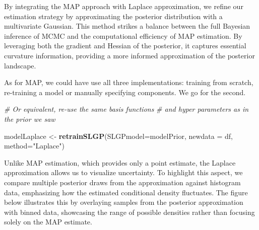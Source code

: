 \documentclass[
]{article}
\newenvironment{Shaded}{\begin{snugshade}}{\end{snugshade}}
\newcommand{\AttributeTok}[1]{\textcolor[rgb]{0.13,0.29,0.53}{#1}}
\newcommand{\CommentTok}[1]{\textcolor[rgb]{0.56,0.35,0.01}{\textit{#1}}}
\newcommand{\FunctionTok}[1]{\textcolor[rgb]{0.13,0.29,0.53}{\textbf{#1}}}
\newcommand{\NormalTok}[1]{#1}
\newcommand{\OtherTok}[1]{\textcolor[rgb]{0.56,0.35,0.01}{#1}}
\newcommand{\StringTok}[1]{\textcolor[rgb]{0.31,0.60,0.02}{#1}}
\begin{document}
By integrating the MAP approach with Laplace approximation, we refine our estimation strategy by approximating the posterior distribution with a multivariate Gaussian. This method strikes a balance between the full Bayesian inference of MCMC and the computational efficiency of MAP estimation. By leveraging both the gradient and Hessian of the posterior, it captures essential curvature information, providing a more informed approximation of the posterior landscape.

As for MAP, we could have use all three implementations: training from scratch, re-training a model or manually specifying components. We go for the second.

\begin{Shaded}
\begin{Highlighting}[]
\CommentTok{\# Or equivalent, re{-}use the same basis functions }
\CommentTok{\# and hyper parameters as in the prior we saw}

\NormalTok{modelLaplace }\OtherTok{\textless{}{-}} \FunctionTok{retrainSLGP}\NormalTok{(}\AttributeTok{SLGPmodel=}\NormalTok{modelPrior, }
                            \AttributeTok{newdata =}\NormalTok{ df, }
                            \AttributeTok{method=}\StringTok{"Laplace"}\NormalTok{)}
\end{Highlighting}
\end{Shaded}

Unlike MAP estimation, which provides only a point estimate, the Laplace approximation allows us to visualize uncertainty. To highlight this aspect, we compare multiple posterior draws from the approximation against histogram data, emphasizing how the estimated conditional density fluctuates. The figure below illustrates this by overlaying samples from the posterior approximation with binned data, showcasing the range of possible densities rather than focusing solely on the MAP estimate.
\end{document}
